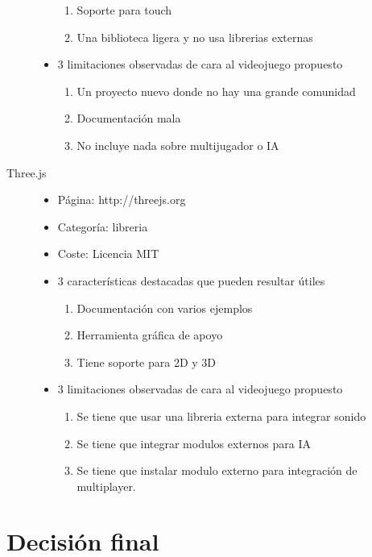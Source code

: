 \documentclass[a4paper]{article}
\begin{document}
\begin{description}
\begin{itemize}
\begin{enumerate}
                \item Soporte para touch
                \item Una biblioteca ligera y no usa librerias externas
            \end{enumerate}
        \item 3 limitaciones observadas de cara al videojuego propuesto
            \begin{enumerate}
                \item Un proyecto nuevo donde no hay una grande comunidad
                \item Documentación mala
                \item No incluye nada sobre multijugador o IA
            \end{enumerate}
    \end{itemize}
    \item[Three.js]
    \begin{itemize}
        \item Página: http://threejs.org
        \item Categoría: libreria
        \item Coste: Licencia MIT
        \item 3 características destacadas que pueden resultar útiles
            \begin{enumerate}
                \item Documentación con varios ejemplos
                \item Herramienta gráfica de apoyo
                \item Tiene soporte para 2D y 3D
            \end{enumerate}
        \item 3 limitaciones observadas de cara al videojuego propuesto
            \begin{enumerate}
                \item Se tiene que usar una libreria externa para integrar sonido
                \item Se tiene que integrar modulos externos para IA
                \item Se tiene que instalar modulo externo para integración de multiplayer.
            \end{enumerate}
    \end{itemize}




\end{description}

\section{Decisión final}
\end{document}
